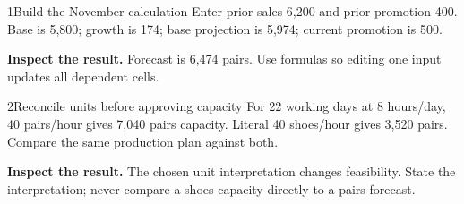 
\begin{labquestion}{1}{Build the November calculation}
Enter prior sales 6,200 and prior promotion 400. Base is 5,800; growth is 174; base projection is 5,974; current promotion is 500.
\end{labquestion}
\begin{labanswer}\textbf{Inspect the result.} Forecast is 6,474 pairs. Use formulas so editing one input updates all dependent cells.\end{labanswer}

\begin{labquestion}{2}{Reconcile units before approving capacity}
For 22 working days at 8 hours/day, 40 pairs/hour gives 7,040 pairs capacity. Literal 40 shoes/hour gives 3,520 pairs. Compare the same production plan against both.
\end{labquestion}
\begin{labanswer}\textbf{Inspect the result.} The chosen unit interpretation changes feasibility. State the interpretation; never compare a shoes capacity directly to a pairs forecast.\end{labanswer}
